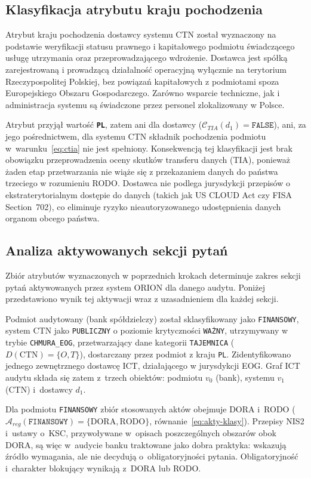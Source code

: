 \subsection{Klasyfikacja atrybutu kraju pochodzenia}

Atrybut kraju pochodzenia dostawcy systemu CTN został wyznaczony na podstawie weryfikacji statusu prawnego i kapitałowego podmiotu świadczącego usługę utrzymania oraz przeprowadzającego wdrożenie. Dostawca jest spółką zarejestrowaną i prowadzącą działalność operacyjną wyłącznie na terytorium Rzeczypospolitej Polskiej, bez powiązań kapitałowych z podmiotami spoza Europejskiego Obszaru Gospodarczego. Zarówno wsparcie techniczne, jak i administracja systemu są świadczone przez personel zlokalizowany w Polsce.

Atrybut przyjął wartość \textbf{\texttt{PL}}, zatem ani dla dostawcy ($\mathcal{C}_{TIA}(d_1) = \texttt{FALSE}$), ani, za jego pośrednictwem, dla systemu CTN składnik pochodzenia podmiotu w~warunku~\eqref{eq:ctia} nie jest spełniony. Konsekwencją tej klasyfikacji jest brak obowiązku przeprowadzenia oceny skutków transferu danych (TIA), ponieważ żaden etap przetwarzania nie wiąże się z przekazaniem danych do państwa trzeciego w rozumieniu RODO. Dostawca nie podlega jurysdykcji przepisów o ekstraterytorialnym dostępie do danych (takich jak US CLOUD Act czy FISA Section~702), co eliminuje ryzyko nieautoryzowanego udostępnienia danych organom obcego państwa.

\subsection{Analiza aktywowanych sekcji pytań}

Zbiór atrybutów wyznaczonych w poprzednich krokach determinuje zakres sekcji pytań aktywowanych przez system ORION dla danego audytu. Poniżej przedstawiono wynik tej aktywacji wraz z uzasadnieniem dla każdej sekcji.

Podmiot audytowany (bank spółdzielczy) został sklasyfikowany jako \texttt{FINANSOWY}, system CTN jako \texttt{PUBLICZNY} o poziomie krytyczności \texttt{WAŻNY}, utrzymywany w trybie \texttt{CHMURA\_EOG}, przetwarzający dane kategorii \texttt{TAJEMNICA} ($D(\text{CTN}) = \{O, T\}$), dostarczany przez podmiot z kraju \texttt{PL}. Zidentyfikowano jednego zewnętrznego dostawcę ICT, działającego w jurysdykcji EOG. Graf ICT audytu składa się zatem z~trzech obiektów: podmiotu $v_0$ (bank), systemu $v_1$ (CTN) i~dostawcy $d_1$.

Dla podmiotu \texttt{FINANSOWY} zbiór stosowanych aktów obejmuje DORA i~RODO ($\mathcal{A}_{reg}(\texttt{FINANSOWY}) = \{\text{DORA}, \text{RODO}\}$, równanie~\eqref{eq:akty-klasy}). Przepisy NIS2 i~ustawy o~KSC, przywoływane w~opisach poszczególnych obszarów obok DORA, są więc w~audycie banku traktowane jako dobra praktyka: wskazują źródło wymagania, ale nie decydują o~obligatoryjności pytania. Obligatoryjność i~charakter blokujący wynikają z~DORA lub RODO.

